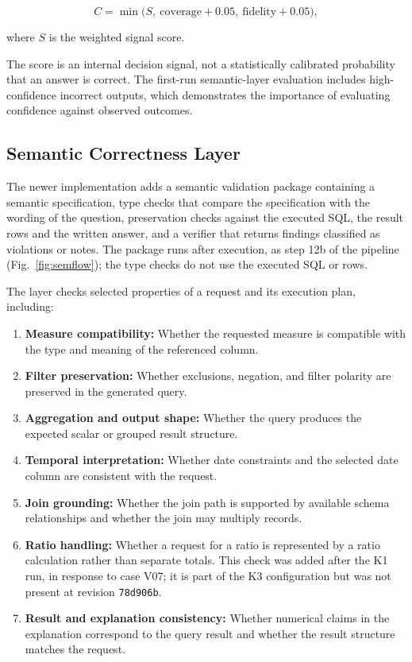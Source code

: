 \documentclass[conference]{IEEEtran}
\begin{document}
\begin{equation}
C = \min\bigl(S,\ \mathrm{coverage}+0.05,\ \mathrm{fidelity}+0.05\bigr),
\label{eq:cap}
\end{equation}

where \(S\) is the weighted signal score.

The score is an internal decision signal, not a statistically calibrated probability that an answer is correct. The first-run semantic-layer evaluation includes high-confidence incorrect outputs, which demonstrates the importance of evaluating confidence against observed outcomes.

\subsection{Semantic Correctness Layer}

The newer implementation adds a semantic validation package containing a semantic specification, type checks that compare the specification with the wording of the question, preservation checks against the executed SQL, the result rows and the written answer, and a verifier that returns findings classified as violations or notes. The package runs after execution, as step 12b of the pipeline (Fig.~\ref{fig:semflow}); the type checks do not use the executed SQL or rows.

The layer checks selected properties of a request and its execution plan, including:

\begin{enumerate}
\def\labelenumi{\arabic{enumi}.}
\item
  \textbf{Measure compatibility:} Whether the requested measure is compatible with the type and meaning of the referenced column.
\item
  \textbf{Filter preservation:} Whether exclusions, negation, and filter polarity are preserved in the generated query.
\item
  \textbf{Aggregation and output shape:} Whether the query produces the expected scalar or grouped result structure.
\item
  \textbf{Temporal interpretation:} Whether date constraints and the selected date column are consistent with the request.
\item
  \textbf{Join grounding:} Whether the join path is supported by available schema relationships and whether the join may multiply records.
\item
  \textbf{Ratio handling:} Whether a request for a ratio is represented by a ratio calculation rather than separate totals. This check was added after the K1 run, in response to case V07; it is part of the K3 configuration but was not present at revision \texttt{78d906b}.
\item
  \textbf{Result and explanation consistency:} Whether numerical claims in the explanation correspond to the query result and whether the result structure matches the request.
\end{enumerate}
\end{document}
